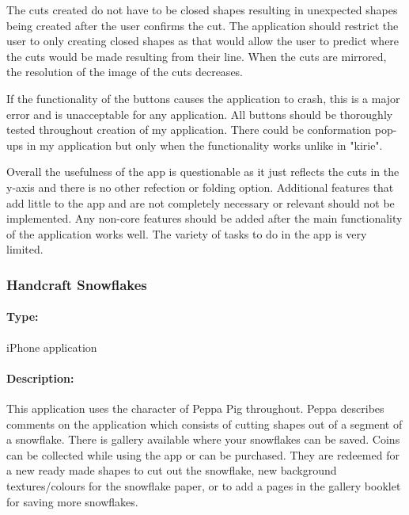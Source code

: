 \documentclass[11pt]{article}
\begin{document}
                The cuts created do not have to be closed shapes resulting in unexpected shapes being created after the user confirms the cut. The application should restrict the user to only creating closed shapes as that would allow the user to predict where the cuts would be made resulting from their line. When the cuts are mirrored, the resolution of the image of the cuts decreases.
               
                If the functionality of the buttons causes the application to crash, this is a major error and is unacceptable for any application. All buttons should be thoroughly tested throughout creation of my application. There could be conformation pop-ups in my application but only when the functionality works unlike in "kirie".
                
                Overall the usefulness of the app is questionable as it just reflects the cuts in the y-axis and there is no other refection or folding option. Additional features that add little to the app and are not completely necessary or relevant should not be implemented. Any non-core features should be added after the main functionality of the application works well. The variety of tasks to do in the app is very limited.
                
                
                 \subsubsection{Handcraft Snowflakes}
            
                \paragraph{Type:} iPhone application %

                \paragraph{Description:}
                This application uses the character of Peppa Pig throughout. Peppa describes comments on the application which consists of cutting shapes out of a segment of a snowflake. There is gallery available where your snowflakes can be saved. Coins can be collected while using the app or can be purchased. They are redeemed for a new ready made shapes to cut out the snowflake, new background textures/colours for the snowflake paper, or to add a pages in the gallery booklet for saving more snowflakes. 
\end{document}
